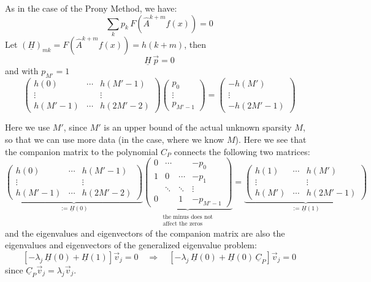 As in the case of the Prony Method, we have:
\begin{equation*}
    \sum_k p_k\, F(\hat{A}^{k+m} f(x)) = 0
\end{equation*}
Let $(\underline{H})_{mk} = F(\hat{A}^{k+m} f(x)) = h(k+m)$, then
\begin{equation*}
    \underline{H}\, \vec{p} = 0
\end{equation*}
and with $p_{M'} = 1$
\begin{equation*}
    \begin{pmatrix} h(0) & \cdots & h(M'-1) \\ \vdots & & \vdots \\ h(M'-1) & \cdots & h(2M'-2) \end{pmatrix}
    \begin{pmatrix} p_0 \\ \vdots \\ p_{M'-1} \end{pmatrix}
    = \begin{pmatrix} -h(M') \\ \vdots \\ -h(2M'-1) \end{pmatrix}
\end{equation*}

Here we use $M'$, since $M'$ is an upper bound of the actual unknown sparsity $M$, so that we can use more data (in the case, where we know $M$).
Here we see that the companion matrix to the polynomial $C_P$ connects the following two matrices:
\begin{equation*}
    \underbrace{\begin{pmatrix} h(0) & \cdots & h(M'-1) \\ \vdots & & \vdots \\ h(M'-1) & \cdots & h(2M'-2) \end{pmatrix}}_{:= \underline{H}(0)}
    \underbrace{\begin{pmatrix} 0 & \cdots & & -p_0 \\ 1 & 0 & \cdots & -p_1 \\ & \ddots & \ddots & \vdots \\ 0 & & 1 & -p_{M'-1} \end{pmatrix}}_{\substack{\text{the minus does not} \\ \text{affect the zeros}}}
    = \underbrace{\begin{pmatrix} h(1) & \cdots & h(M') \\ \vdots & & \vdots \\ h(M') & \cdots & h(2M'-1) \end{pmatrix}}_{:= \underline{H}(1)}
\end{equation*}
and the eigenvalues and eigenvectors of the companion matrix are also the eigenvalues and eigenvectors of the generalized eigenvalue problem:
\begin{equation*}
    \left[ -\lambda_j\, \underline{H}(0) + \underline{H}(1) \right] \vec{v}_j = 0 \quad \Rightarrow \quad \left[ -\lambda_j\, \underline{H}(0) + \underline{H}(0)\, \underline{C}_P \right] \vec{v}_j = 0
\end{equation*}
since $\underline{C}_P\vec{v}_j = \lambda_j \vec{v}_j$.

